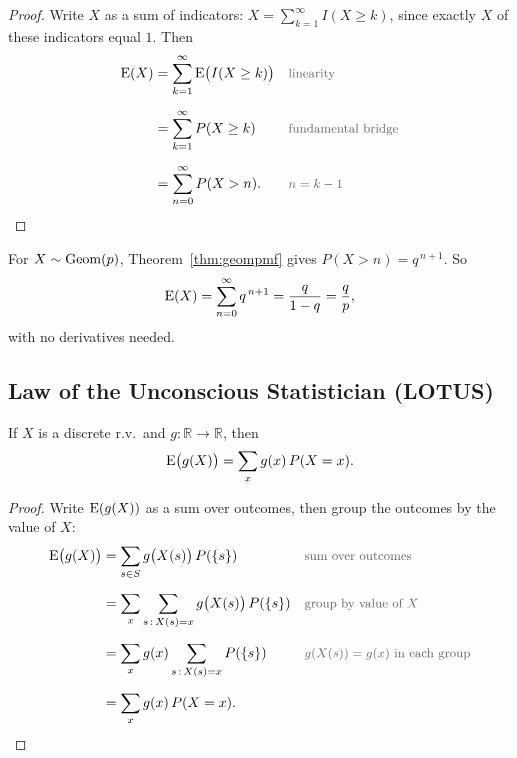 \medskip

\begin{proof}
Write $X$ as a sum of indicators: $X = \sum_{k=1}^{\infty} I(X \ge k)$, since exactly $X$ of these indicators equal $1$. Then
\medskip
\begin{align*}
\E(X)
  &= \sum_{k=1}^{\infty} \E\bigl(I(X \ge k)\bigr)
  && \by{linearity} \\[0.6em]
  &= \sum_{k=1}^{\infty} P(X \ge k)
  && \by{fundamental bridge} \\[0.6em]
  &= \sum_{n=0}^{\infty} P(X > n).
  && \by{$n = k - 1$}
\end{align*}
\end{proof}

\bigskip

\begin{example}
For $X \sim \operatorname{Geom}(p)$, Theorem~\ref{thm:geompmf} gives $P(X > n) = q^{\,n+1}$. So
\medskip
\[
\operatorname{E}(X) = \sum_{n=0}^{\infty} q^{\,n+1} = \frac{q}{1 - q} = \frac{q}{p},
\]
\medskip
with no derivatives needed.
\end{example}

\bigskip

\subsection{Law of the Unconscious Statistician (LOTUS)}

\bigskip

\begin{theorem}[LOTUS]\label{thm:lotus}
If $X$ is a discrete r.v.\ and $g : \mathbb{R} \to \mathbb{R}$, then
\medskip
\[
\operatorname{E}\bigl(g(X)\bigr) = \sum_{x} g(x)\, P(X = x).
\]
\end{theorem}

\medskip

\begin{proof}
Write $\operatorname{E}(g(X))$ as a sum over outcomes, then group the outcomes by the value of $X$:
\medskip
\begin{align*}
\E\bigl(g(X)\bigr)
  &= \sum_{s \in S} g\bigl(X(s)\bigr)\, P(\{s\})
  && \by{sum over outcomes} \\[0.6em]
  &= \sum_{x} \sum_{s \,:\, X(s) = x} g\bigl(X(s)\bigr)\, P(\{s\})
  && \by{group by value of $X$} \\[0.6em]
  &= \sum_{x} g(x) \sum_{s \,:\, X(s) = x} P(\{s\})
  && \by{$g(X(s)) = g(x)$ in each group} \\[0.6em]
  &= \sum_{x} g(x)\, P(X = x).
\end{align*}
\end{proof}

